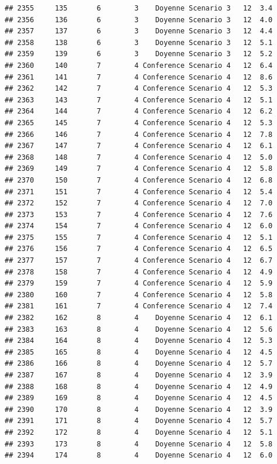 \documentclass[
]{article}
\begin{document}
\begin{verbatim}
## 2355     135       6        3    Doyenne Scenario 3   12  3.4
## 2356     136       6        3    Doyenne Scenario 3   12  4.0
## 2357     137       6        3    Doyenne Scenario 3   12  4.4
## 2358     138       6        3    Doyenne Scenario 3   12  5.1
## 2359     139       6        3    Doyenne Scenario 3   12  5.2
## 2360     140       7        4 Conference Scenario 4   12  6.4
## 2361     141       7        4 Conference Scenario 4   12  8.6
## 2362     142       7        4 Conference Scenario 4   12  5.3
## 2363     143       7        4 Conference Scenario 4   12  5.1
## 2364     144       7        4 Conference Scenario 4   12  6.2
## 2365     145       7        4 Conference Scenario 4   12  5.3
## 2366     146       7        4 Conference Scenario 4   12  7.8
## 2367     147       7        4 Conference Scenario 4   12  6.1
## 2368     148       7        4 Conference Scenario 4   12  5.0
## 2369     149       7        4 Conference Scenario 4   12  5.8
## 2370     150       7        4 Conference Scenario 4   12  6.8
## 2371     151       7        4 Conference Scenario 4   12  5.4
## 2372     152       7        4 Conference Scenario 4   12  7.0
## 2373     153       7        4 Conference Scenario 4   12  7.6
## 2374     154       7        4 Conference Scenario 4   12  6.0
## 2375     155       7        4 Conference Scenario 4   12  5.1
## 2376     156       7        4 Conference Scenario 4   12  6.5
## 2377     157       7        4 Conference Scenario 4   12  6.7
## 2378     158       7        4 Conference Scenario 4   12  4.9
## 2379     159       7        4 Conference Scenario 4   12  5.9
## 2380     160       7        4 Conference Scenario 4   12  5.8
## 2381     161       7        4 Conference Scenario 4   12  7.4
## 2382     162       8        4    Doyenne Scenario 4   12  6.1
## 2383     163       8        4    Doyenne Scenario 4   12  5.6
## 2384     164       8        4    Doyenne Scenario 4   12  5.3
## 2385     165       8        4    Doyenne Scenario 4   12  4.5
## 2386     166       8        4    Doyenne Scenario 4   12  5.7
## 2387     167       8        4    Doyenne Scenario 4   12  3.9
## 2388     168       8        4    Doyenne Scenario 4   12  4.9
## 2389     169       8        4    Doyenne Scenario 4   12  4.5
## 2390     170       8        4    Doyenne Scenario 4   12  3.9
## 2391     171       8        4    Doyenne Scenario 4   12  5.7
## 2392     172       8        4    Doyenne Scenario 4   12  5.1
## 2393     173       8        4    Doyenne Scenario 4   12  5.8
## 2394     174       8        4    Doyenne Scenario 4   12  6.0

\end{verbatim}
\end{document}
